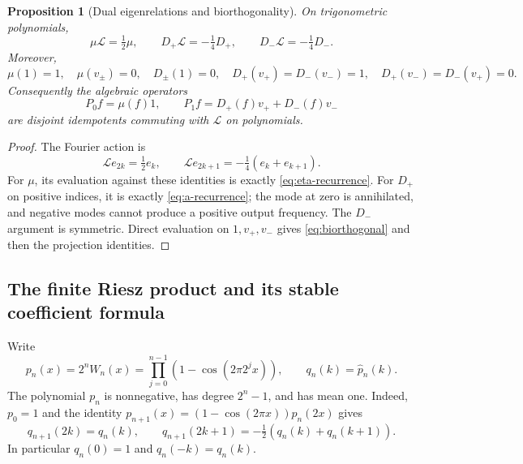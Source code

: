 \documentclass[11pt,a4paper]{article}
\newtheorem{proposition}[theorem]{Proposition}
\theoremstyle{definition}
\theoremstyle{remark}
\newcommand{\Lop}{\mathcal L}
\numberwithin{equation}{section}
\begin{document}
\begin{proposition}[Dual eigenrelations and biorthogonality]
\label{prop:dual-eigen}
On trigonometric polynomials,
\begin{equation}
 \mu\Lop=\tfrac12\mu,\qquad
 D_+\Lop=-\tfrac14D_+,\qquad
 D_-\Lop=-\tfrac14D_-.
 \label{eq:dual-eigen}
\end{equation}
Moreover,
\begin{equation}
 \mu(1)=1,\quad\mu(v_\pm)=0,\quad D_\pm(1)=0,
 \quad D_+(v_+)=D_-(v_-)=1,\quad D_+(v_-)=D_-(v_+)=0.
 \label{eq:biorthogonal}
\end{equation}
Consequently the algebraic operators
\begin{equation}
 P_0f=\mu(f)1,\qquad
 P_1f=D_+(f)v_++D_-(f)v_-
 \label{eq:P01}
\end{equation}
are disjoint idempotents commuting with $\Lop$ on polynomials.
\end{proposition}
\begin{proof}
The Fourier action is
\begin{equation}
 \Lop e_{2k}=\tfrac12e_k,\qquad
 \Lop e_{2k+1}=-\tfrac14(e_k+e_{k+1}).
 \label{eq:dyadic-mode-rule}
\end{equation}
For $\mu$, its evaluation against these identities is exactly
\eqref{eq:eta-recurrence}. For $D_+$ on positive indices, it is exactly
\eqref{eq:a-recurrence}; the mode at zero is annihilated, and negative
modes cannot produce a positive output frequency. The $D_-$ argument is
symmetric. Direct evaluation on $1,v_+,v_-$ gives
\eqref{eq:biorthogonal} and then the projection identities.
\end{proof}

\subsection{The finite Riesz product and its stable coefficient formula}
Write
\begin{equation}
 p_n(x)=2^nW_n(x)=\prod_{j=0}^{n-1}(1-\cos(2\pi2^jx)),
 \qquad q_n(k)=\widehat p_n(k).
 \label{eq:pn}
\end{equation}
The polynomial $p_n$ is nonnegative, has degree $2^n-1$, and has mean one.
Indeed, $p_0=1$ and the identity
$p_{n+1}(x)=(1-\cos(2\pi x))p_n(2x)$ gives
\begin{equation}
 q_{n+1}(2k)=q_n(k),\qquad
 q_{n+1}(2k+1)=-\tfrac12(q_n(k)+q_n(k+1)).
 \label{eq:qn-recurrence}
\end{equation}
In particular $q_n(0)=1$ and $q_n(-k)=q_n(k)$.
\end{document}
